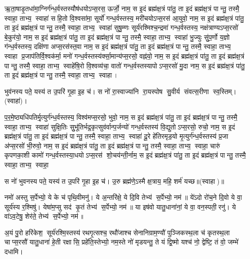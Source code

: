 ऋ॒ता॒षाडृ॒तधा॑मा॒ग्निर्ग॑न्ध॒र्वस्तस्यौष॑धयोऽप्स॒रस॒ ऊर्जो॒ नाम॒ स इ॒दं ब्रह्म॑क्ष॒त्रं पा॑तु॒ ता इ॒दं ब्रह्म॑क्ष॒त्रं पान्तु॒ तस्मै॒ स्वाहा॒ ताभ्य॒ स्वाहा॑
सहि॒तो वि॒श्वसा॑मा॒ सूर्यो॑ गन्ध॒र्वस्तस्य॒ मरी॑चयोऽप्स॒रस॑ आ॒युवो॒ नाम॒  स इ॒दं ब्रह्म॑क्ष॒त्रं पा॑तु॒ ता इ॒दं ब्रह्म॑क्ष॒त्रं पान्तु॒ तस्मै॒ स्वाहा॒ ताभ्य॒ स्वाहा॑
सुषु॒म्णः सूर्य॑रश्मिश्च॒न्द्रमा॑ गन्ध॒र्वस्तस्य॒ नक्ष॑त्राण्यऽप्स॒रसो॑ बे॒कुर॑यो॒ नाम॒  स इ॒दं ब्रह्म॑क्ष॒त्रं पा॑तु॒ ता इ॒दं ब्रह्म॑क्ष॒त्रं पान्तु॒ तस्मै॒ स्वाहा॒ ताभ्य॒ स्वाहा॑
भु॒ज्युः सुु॑प॒र्णो य॒ज्ञो ग॑न्ध॒र्वस्तस्य॒ दक्षि॑णा अप्स॒रस॑स्त॒वा  नाम॒  स इ॒दं ब्रह्म॑क्ष॒त्रं पा॑तु॒ ता इ॒दं ब्रह्म॑क्ष॒त्रं पान्तु॒ तस्मै॒ स्वाहा॒ ताभ्य॒ स्वाहा
प्र॒जाप॑तिर्वि॒श्वक॑र्मा॒ मनो॑ गन्ध॒र्वस्तस्य॑र्क्सा॒मान्य॑प्स॒रसो॒ वह्न॑यो॒  नाम॒  स इ॒दं ब्रह्म॑क्ष॒त्रं पा॑तु॒ ता इ॒दं ब्रह्म॑क्ष॒त्रं पान्तु॒ तस्मै॒ स्वाहा॒ ताभ्य॒ 
स्वाहे॑षि॒रो वि॒श्वव्य॑चा॒ वातो॑ गन्ध॒र्वस्तस्यापोऽप्स॒रसो॑ मु॒दा नाम॒  स इ॒दं ब्रह्म॑क्ष॒त्रं पा॑तु॒ ता इ॒दं ब्रह्म॑क्ष॒त्रं पान्तु॒ तस्मै॒ स्वाहा॒ ताभ्य॒ स्वाहा।

भुव॑नस्य पते॒ यस्य॑ त उ॒परि॑ गृ॒हा इ॒ह च॑।
स नो॑ रा॒स्वाज्या॑नि रा॒यस्पोष सु॒वीर्य संवत्स॒रीणा स्व॒स्तिम्। (स्वाहा॑)।

प॒र॒मे॒ष्ठ्यधि॑पतिर्मृ॒त्युर्ग॑न्ध॒र्वस्तस्य॒ विश्व॑मप्स॒रसो॒ भुवो॒  नाम॒ स इ॒दं ब्रह्म॑क्ष॒त्रं पा॑तु॒ ता इ॒दं ब्रह्म॑क्ष॒त्रं पान्तु॒ तस्मै॒ स्वाहा॒ ताभ्य॒ स्वाहा॑
सुक्षि॒तिः सुुभू॑तिर्भद्र॒कृत्सुव॑र्वान्प॒र्जन्यो॑ गन्ध॒र्वस्तस्य॑ वि॒द्युतोऽप्स॒रसो॒ रुचो॒  नाम॒ स इ॒दं ब्रह्म॑क्ष॒त्रं पा॑तु॒ ता इ॒दं ब्रह्म॑क्ष॒त्रं पान्तु॒ तस्मै॒ स्वाहा॒ ताभ्य॒ स्वाहा॑
दू॒रे हे॑तिरमृड॒यो मृ॒त्युर्ग॑न्ध॒र्वस्तस्य॑ प्र॒जा अ॑प्स॒रसो॑ भी॒रुवो॒  नाम॒ स इ॒दं ब्रह्म॑क्ष॒त्रं पा॑तु॒ ता इ॒दं ब्रह्म॑क्ष॒त्रं पान्तु॒ तस्मै॒ स्वाहा॒ ताभ्य॒ स्वाहा॒
चारु॑ कृपणका॒शी कामो॑ गन्ध॒र्वस्तस्या॒धयोऽप्स॒रस॑ शो॒चय॑न्ती॒र्नाम॒ स इ॒दं ब्रह्म॑क्ष॒त्रं पा॑तु॒ ता इ॒दं ब्रह्म॑क्ष॒त्रं पान्तु॒ तस्मै॒ स्वाहा॒ ताभ्य॒ स्वाहा॒

स नो॑ भुवनस्य पते॒ यस्य॑ त उ॒परि॑ गृ॒हा इ॒ह च॑।
उ॒रु ब्रह्म॑णे॒ऽस्मै क्ष॒त्राय॒ महि॒ शर्म॑ यच्छ॥(स्वाहा)॥

नमो॑ अस्तु स॒र्पेभ्यो॒ ये के च॑ पृथि॒वीमनु॑।
ये अ॒न्तरि॑क्षे॒ ये दि॒वि  तेभ्य॑ स॒र्पेभ्यो॒ नम॑॥
ये॑ऽदो रो॑च॒ने दि॒वो ये वा॒ सूर्य॑स्य र॒श्मिषु॑।
येषा॑म॒प्सु सद॑ कृ॒तं तेभ्य॑ स॒र्पेभ्यो॒ नम॑॥
या इष॑वो यातु॒धाना॑नां॒ ये वा॒ वन॒स्पती॒रनु॑।
ये वा॑ऽव॒टेषु॒ शेर॑ते॒ तेभ्य॑ स॒र्पेभ्यो॒ नम॑॥

अ॒यं पु॒रो हरि॑केश॒ सूर्य॑रश्मि॒स्तस्य॑ रथगृ॒त्सश्च॒ रथौ॑जाश्च सेनानिग्राम॒ण्यौ॑
पुञ्जिकस्थ॒ला च॑ कृतस्थ॒ला चाप्स॒रसौ॑ यातु॒धाना॑ हे॒ती रक्षासि॒ प्रहे॑ति॒स्तेभ्यो॒
नम॒स्ते नो॑ मृडयन्तु॒ ते यं द्वि॒ष्मो यश्च॑ नो॒ द्वेष्टि॒ तं वो॒  जम्भे॑ दधामि।


